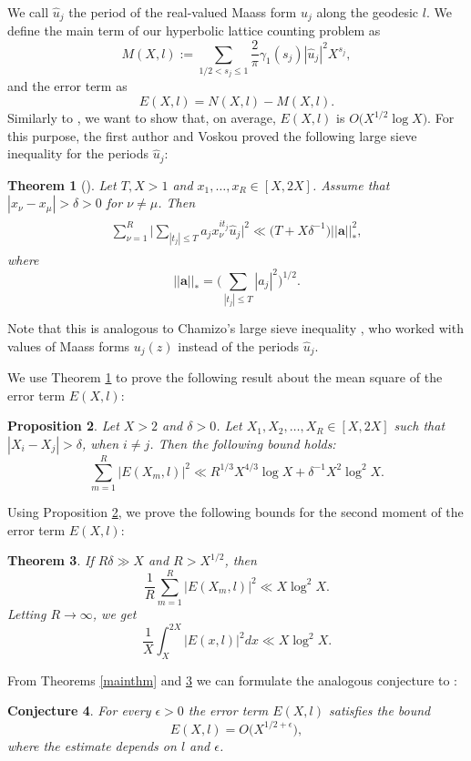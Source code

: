 \documentclass[a4paper,11pt]{amsart}
\newtheorem{theorem}{Theorem}[section]
\newtheorem{proposition}[theorem]{Proposition}
\newtheorem{conjecture}[theorem]{Conjecture}
\theoremstyle{definition}
\begin{document}
We call $\hat{u}_j$ the period of the real-valued Maass form $u_j$ along the geodesic $l$. 
We define the main term of our hyperbolic lattice counting problem as
$$M(X,l):= \sum_{1/2< s_j \le 1} \frac{2}{\pi}\gamma_1(s_j)|\hat{u}_j|^2X^{s_j}, $$ and the error term as 
$$ E(X,l)=N(X,l)-M(X,l).$$
Similarly to \cite[Th. 1.2]{CP}, we want to show that, on average, $E(X,l)$ is $O\big(X^{1/2}\log X\big)$. For this purpose, the first author and Voskou proved the following large sieve inequality for the periods $\hat{u}_j$:
\begin{theorem}[\cite{Lsieve}]\label{Sieve}
Let $T,X>1$ and $x_1, \dots , x_R \in [X,2X]$. Assume that $|x_\nu-x_\mu| > \delta >0$ for $\nu \neq \mu$. Then
\begin{align}
    \begin{split}
        \sum_{\nu=1}^R \Big| \sum_{|t_j|\le T}a_jx_\nu^{it_j}\hat{u}_j\Big|^2 \ll \big(T+X\delta^{-1}\big)||\mathbf{a}||_*^2,
    \end{split}
\end{align}
where $$||\mathbf{a}||_*= \Big(\sum_{|t_j| \le T}|a_j|^2\Big)^{1/2}.$$
\end{theorem}
Note that this is analogous to Chamizo's large sieve inequality \cite[Theorem 2.2]{Cham1}, who worked with values of Maass forms $u_j(z)$ instead of the periods $\hat{u}_j$. \par
We use Theorem \ref{Sieve} to prove the following result about the mean square of the error term $E(X,l)$:
\begin{proposition}\label{SecondMomProp}
Let $X>2$ and $\delta>0$. Let $X_1,X_2, \dots ,X_R \in [X,2X]$ such that $|X_i-X_j|>\delta$, when $i \ne j$. Then the following bound holds:
$$\sum_{m=1}^R|E(X_m,l)|^2 \ll R^{1/3}X^{4/3}\log X+\delta^{-1}X^2\log^2X.$$
\end{proposition}
Using Proposition \ref{SecondMomProp}, we prove the following bounds for the second moment of the error term $E(X,l)$:
\begin{theorem}\label{SecondMomthm}
If $R\delta \gg X$ and $R>X^{1/2}$, then
\begin{equation}\label{1/R}
    \frac{1}{R}\sum_{m=1}^R|E(X_m,l)|^2 \ll X\log^2X. 
\end{equation}
Letting $R \to \infty$, we get
\begin{equation}\label{1/X}
    \frac{1}{X}\int_X^{2X}|E(x,l)|^2dx \ll X\log^2X.
\end{equation} 
\end{theorem}
From Theorems \ref{mainthm} and \ref{SecondMomthm} we can formulate the analogous conjecture to \cite[Conj. 5.7]{CP}:
\begin{conjecture}
For every $\epsilon>0$ the error term $E(X,l)$ satisfies the bound
$$E(X,l)=O\big(X^{1/2+\epsilon}\big),$$
where the estimate depends on $l$ and $\epsilon$.
\end{conjecture}
\end{document}
